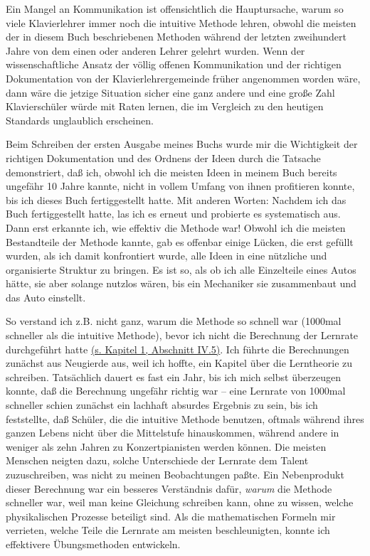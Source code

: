 Ein Mangel an Kommunikation ist offensichtlich die Hauptursache, warum so viele Klavierlehrer immer noch die intuitive Methode lehren, obwohl die meisten der in diesem Buch beschriebenen Methoden während der letzten zweihundert Jahre von dem einen oder anderen Lehrer gelehrt wurden.
Wenn der wissenschaftliche Ansatz der völlig offenen Kommunikation und der richtigen Dokumentation von der Klavierlehrergemeinde früher angenommen worden wäre, dann wäre die jetzige Situation sicher eine ganz andere und eine große Zahl Klavierschüler würde mit Raten lernen, die im Vergleich zu den heutigen Standards unglaublich erscheinen.

Beim Schreiben der ersten Ausgabe meines Buchs wurde mir die Wichtigkeit der richtigen Dokumentation und des Ordnens der Ideen durch die Tatsache demonstriert, daß ich, obwohl ich die meisten Ideen in meinem Buch bereits ungefähr 10 Jahre kannte, nicht in vollem Umfang von ihnen profitieren konnte, bis ich dieses Buch fertiggestellt hatte.
Mit anderen Worten: Nachdem ich das Buch fertiggestellt hatte, las ich es erneut und probierte es systematisch aus.
Dann erst erkannte ich, wie effektiv die Methode war!
Obwohl ich die meisten Bestandteile der Methode kannte, gab es offenbar einige Lücken, die erst gefüllt wurden, als ich damit konfrontiert wurde, alle Ideen in eine nützliche und organisierte Struktur zu bringen.
Es ist so, als ob ich alle Einzelteile eines Autos hätte, sie aber solange nutzlos wären, bis ein Mechaniker sie zusammenbaut und das Auto einstellt.

So verstand ich z.B. nicht ganz, warum die Methode so schnell war (1000mal schneller als die intuitive Methode), bevor ich nicht die Berechnung der Lernrate durchgeführt hatte \hyperref[c1iv5]{(s. Kapitel 1, Abschnitt IV.5)}.
Ich führte die Berechnungen zunächst aus Neugierde aus, weil ich hoffte, ein Kapitel über die Lerntheorie zu schreiben.
Tatsächlich dauert es fast ein Jahr, bis ich mich selbst überzeugen konnte, daß die Berechnung ungefähr richtig war -- eine Lernrate von 1000mal schneller schien zunächst ein lachhaft absurdes Ergebnis zu sein, bis ich feststellte, daß Schüler, die die intuitive Methode benutzen, oftmals während ihres ganzen Lebens nicht über die Mittelstufe hinauskommen, während andere in weniger als zehn Jahren zu Konzertpianisten werden können.
Die meisten Menschen neigten dazu, solche Unterschiede der Lernrate dem Talent zuzuschreiben, was nicht zu meinen Beobachtungen paßte.
Ein Nebenprodukt dieser Berechnung war ein besseres Verständnis dafür, \textit{warum} die Methode schneller war, weil man keine Gleichung schreiben kann, ohne zu wissen, welche physikalischen Prozesse beteiligt sind.
Als die mathematischen Formeln mir verrieten, welche Teile die Lernrate am meisten beschleunigten, konnte ich effektivere Übungsmethoden entwickeln.

